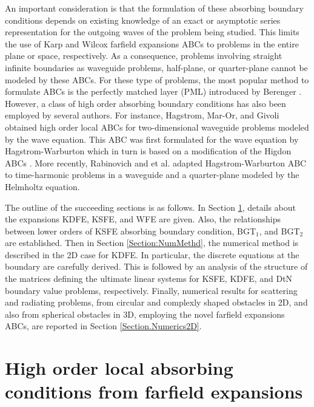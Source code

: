 \documentclass[final,3p,times,12pt]{elsarticle}
\begin{document}
An important consideration is that the formulation of these absorbing boundary conditions depends on existing knowledge of an exact or asymptotic series representation for the outgoing waves of the problem being studied. This limits the use of Karp and Wilcox farfield expansions ABCs to problems in the entire plane or space, respectively.  As a consequence, problems involving straight  infinite boundaries as waveguide problems, half-plane, or quarter-plane cannot be modeled by these ABCs. For these type of problems, the most popular method to formulate ABCs is the perfectly matched layer (PML) introduced by Berenger \cite{Berenger01}. However, a class of high order absorbing boundary conditions has also been employed by several authors. For instance, 
Hagstrom, Mar-Or, and Givoli \cite{H-MO-Givoli2008} obtained high order local ABCs for two-dimensional waveguide problems modeled by the wave equation. This ABC was first formulated for the wave equation by Hagstrom-Warburton \cite{H-W} which in turn is based on a modification of the Higdon ABCs \cite{Higdon1987}. More recently,
Rabinovich and et al. \cite{Rab-Giv-Bec-2010} adapted Hagstrom-Warburton ABC to time-harmonic problems in a waveguide and a quarter-plane modeled by the Helmholtz equation. 

The outline of the succeeding sections is as follows. In Section \ref{Section.Formulation}, details about the expansions KDFE, KSFE, and WFE are given. Also, the relationships between lower orders of KSFE absorbing boundary condition, BGT$_1$, and BGT$_2$ are established. Then in Section \ref{Section:NumMethd}, the numerical method is described in the 2D case for KDFE. In particular, the discrete equations at the boundary are carefully derived. This is followed by an analysis of the structure of the matrices defining the ultimate linear systems for KSFE, KDFE, and DtN boundary value problems, respectively. Finally, numerical results for scattering and radiating problems, from circular and complexly shaped obstacles in 2D, and also from spherical obstacles in 3D, employing the novel farfield expansions ABCs, are reported in Section \ref{Section.Numerics2D}.


\section{High order local absorbing conditions from farfield expansions
} \label{Section.Formulation}
\end{document}
